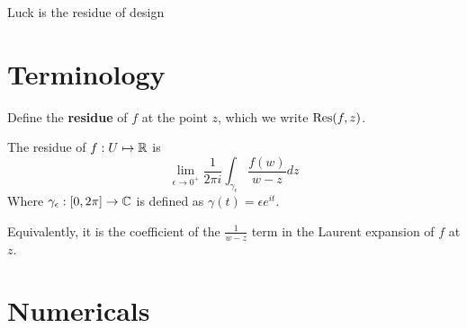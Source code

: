 \documentclass{homework}
\author{Jim Fowler}
\begin{document}
\maketitle

\begin{inspiration}
  Luck is the residue of design
    \end{inspiration}

    \section{Terminology}

    \begin{problem}
      Define the \textbf{residue} of $f$ at the point $z$, which we write $\operatorname{Res}(f,z)$.
      \end{problem}
      \begin{solution}
      The residue of $f:U\mapsto \mathbb{R}$ is 
      \[
      \lim_{\epsilon\to 0^+} \frac{1}{2\pi i}\int_{\gamma_\epsilon} \frac{f(w)}{w-z} dz
      \]
      Where $\gamma_\epsilon:[0, 2\pi ] \to \mathbb{C}$ is defined as $\gamma(t) = \epsilon e^{it}$.

      Equivalently, it is the coefficient of the $\frac{1}{w-z}$ term in the Laurent expansion of $f$ at $z$.
      \end{solution}
      \section{Numericals}
\end{document}
